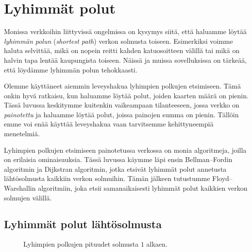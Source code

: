 \chapter{Lyhimmät polut}


Monissa verkkoihin liittyvissä ongelmissa on kysymys siitä,
että haluamme löytää \emph{lyhimmän polun} (\emph{shortest path})
verkon solmusta toiseen.
Esimerkiksi voimme haluta selvittää,
mikä on nopein reitti kahden katuosoitteen välillä
tai mikä on halvin tapa lentää kaupungista toiseen.
Näissä ja muissa sovelluksissa on tärkeää,
että löydämme lyhimmän polun tehokkaasti.

Olemme käyttäneet aiemmin leveyshakua lyhimpien
polkujen etsimiseen.
Tämä onkin hyvä ratkaisu, kun haluamme löytää polut,
joiden kaarten määrä on pienin.
Tässä luvussa keskitymme kuitenkin vaikeampaan
tilanteeseen, jossa verkko on \emph{painotettu}
ja haluamme löytää polut,
joissa painojen summa on pienin.
Tällöin emme voi enää käyttää leveyshakua vaan
tarvitsemme kehittyneempiä menetelmiä.

Lyhimpien polkujen etsimiseen painotetussa verkossa
on monia algoritmeja, joilla on erilaisia ominaisuuksia.
Tässä luvussa käymme läpi ensin Bellman–Fordin algoritmin ja
Dijkstran algoritmin,
jotka etsivät lyhimmät polut annetusta lähtösolmusta
kaikkiin verkon solmuihin.
Tämän jälkeen tutustumme Floyd–Warshallin algoritmiin,
joka etsii samanaikaisesti lyhimmät polut kaikkien
verkon solmujen välillä.

\section{Lyhimmät polut lähtösolmusta}

\begin{figure}
\center
\begin{center}
\end{center}
\caption{Lyhimpien polkujen pituudet solmusta $1$ alkaen.}
\label{fig:lypola}
\end{figure}

